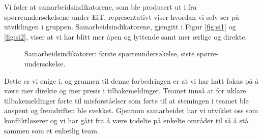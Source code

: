 Vi føler at samarbeidsindikatorene, som ble produsert ut i fra spørreundersøkelsene under EiT, representativt
viser hvordan vi selv ser på utviklingen i gruppen. Samarbeidsindikatorene, gjengitt i Figur \ref{fig:si1} og \ref{fig:si2}, viser 
at vi har blitt mer åpen og lyttende samt mer ærlige og direkte. 
\begin{figure}[H] \centering
{}
\caption{Samarbeidsindikatorer: \protect{\ref{fig:si1}} første spørreundersøkelse, \protect{\ref{fig:si2}} siste spørre{-}undersøkelse.}
\end{figure}
Dette er vi enige i, og grunnen til denne forbedringen er at vi har hatt fokus på å være mer direkte og mer presis i tilbakemeldinger.
Teamet innså at for uklare tilbakemeldinger førte til misforståelser som førte til at stemingen i teamet ble anspent og fremdriften ble
svekket. Gjennom samarbeidet har vi utviklet oss som konfliktløserer og vi har gått fra å være todelte på enkelte områder
til så å stå sammen som et enhetlig team.
